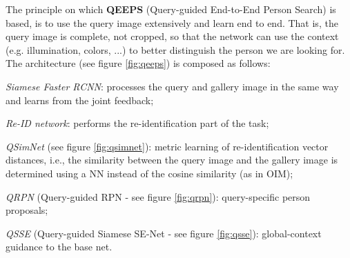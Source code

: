 The principle on which \textbf{QEEPS} (Query-guided End-to-End Person Search) is based, is to use the query image extensively and learn end to end. That is, the query image is complete, not cropped, so that the network can use the context (e.g. illumination, colors, ...) to better distinguish the person we are looking for.\\
The architecture (see figure \ref{fig:qeeps}) is composed as follows:
\begin{myitem}
    \item \textit{Siamese Faster RCNN}: processes the query and gallery image in the same way and learns from the joint feedback;
    \item \textit{Re-ID network}: performs the re-identification part of the task;
    \item \textit{QSimNet} (see figure \ref{fig:qsimnet}): metric learning of re-identification vector distances, i.e., the similarity between the query image and the gallery image is determined using a NN instead of the cosine similarity (as in OIM);
    \item \textit{QRPN} (Query-guided RPN - see figure \ref{fig:qrpn}): query-specific person proposals;
    \item \textit{QSSE} (Query-guided Siamese SE-Net - see figure \ref{fig:qsse}): global-context guidance to the base net.
\end{myitem}

